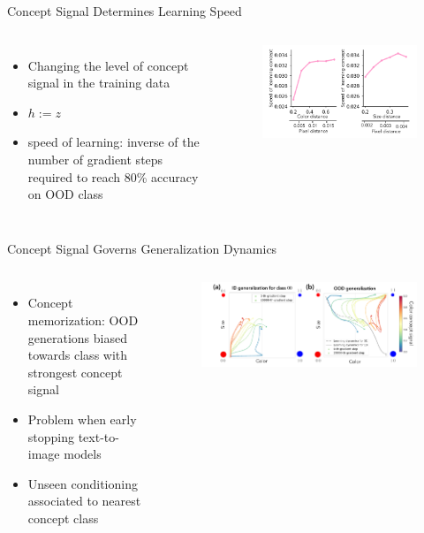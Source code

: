 \begin{frame}[t]{Concept Signal Determines Learning Speed}
\begin{columns}
\begin{itemize}
    \item Changing the level of concept signal in the training data
    \item $h := z$
    \item speed of learning: inverse of the number of gradient steps required to reach 80\% accuracy on OOD class
\end{itemize}
\begin{figure}
    \centering
    \includegraphics[width=\linewidth]{figures/figure_3_speed.png}
\end{figure}
\end{columns}
\end{frame}

\begin{frame}[t]{Concept Signal Governs Generalization Dynamics}
\begin{columns}
\begin{itemize}
    \item Concept memorization: OOD generations biased towards class with strongest concept signal
    \item Problem when early stopping text-to-image models
    \item Unseen conditioning associated to nearest concept class
\end{itemize}
\begin{figure}
    \centering
    \includegraphics[width=\linewidth]{figures/figure_4.png}
\end{figure}
\end{columns}
\end{frame}

